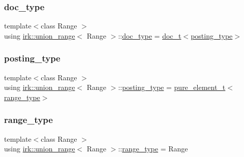 \subsubsection{\texorpdfstring{doc\+\_\+type}{doc\_type}}
{\footnotesize\ttfamily template$<$class Range $>$ \\
using \mbox{\hyperlink{classirk_1_1union__range}{irk\+::union\+\_\+range}}$<$ Range $>$\+::\mbox{\hyperlink{classirk_1_1union__range_aa502a10f2f5c682199072c0ba11a77a9}{doc\+\_\+type}} =  \mbox{\hyperlink{namespaceirk_af5d95ec091f3bd711790e71ccb533903}{doc\+\_\+t}}$<$\mbox{\hyperlink{classirk_1_1union__range_ac125c83e17d473ee5480fef76cfe42f9}{posting\+\_\+type}}$>$}

\mbox{\label{classirk_1_1union__range_ac125c83e17d473ee5480fef76cfe42f9}} 
\subsubsection{\texorpdfstring{posting\+\_\+type}{posting\_type}}
{\footnotesize\ttfamily template$<$class Range $>$ \\
using \mbox{\hyperlink{classirk_1_1union__range}{irk\+::union\+\_\+range}}$<$ Range $>$\+::\mbox{\hyperlink{classirk_1_1union__range_ac125c83e17d473ee5480fef76cfe42f9}{posting\+\_\+type}} =  \mbox{\hyperlink{namespaceirk_a1e48b43a3f40d553264380da5e7263c1}{pure\+\_\+element\+\_\+t}}$<$\mbox{\hyperlink{classirk_1_1union__range_aae1621f1e73b1b78990ad11eaa52452b}{range\+\_\+type}}$>$}

\mbox{\label{classirk_1_1union__range_aae1621f1e73b1b78990ad11eaa52452b}} 
\subsubsection{\texorpdfstring{range\+\_\+type}{range\_type}}
{\footnotesize\ttfamily template$<$class Range $>$ \\
using \mbox{\hyperlink{classirk_1_1union__range}{irk\+::union\+\_\+range}}$<$ Range $>$\+::\mbox{\hyperlink{classirk_1_1union__range_aae1621f1e73b1b78990ad11eaa52452b}{range\+\_\+type}} =  Range}

